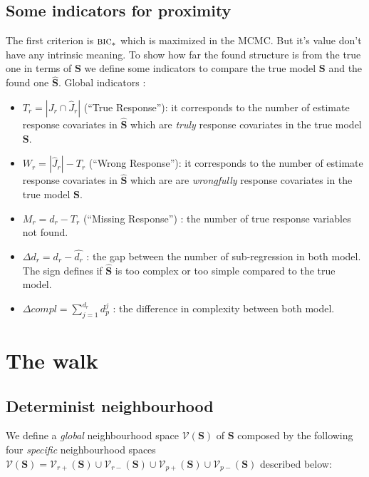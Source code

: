 \documentclass[12pt,a4paper]{report}
\begin{document}
		\subsection{Some indicators for proximity}
		The first criterion is $\mbox{{\sc bic}}_*$ which is maximized in the MCMC. But it's value don't have any intrinsic meaning. To show how far the found structure is from the true one in terms of $\boldsymbol{S}$ we define some indicators to compare the true model $\boldsymbol{S}$ and the found one $\hat{\boldsymbol{S}}$.
			Global indicators :
			\begin{itemize}
				\item $T_r=|J_r \cap \hat{J}_r|$ (``True Response''): it corresponds to the number of estimate response covariates in $\hat{\boldsymbol{S}}$ which are {\it truly} response covariates in the true model $\boldsymbol{S}$.
				\item $W_r=|\hat{J}_r|-T_r$ (``Wrong Response''): it corresponds to the number of estimate response covariates in $\hat{\boldsymbol{S}}$ which are are {\it wrongfully} response covariates in the true model $\boldsymbol{S}$.
				\item $M_r=d_r-T_r$ (``Missing Response'') : the number of true response variables not found.
				\item $\Delta d_r=d_r-\hat{d_r}$ : the gap between the number of sub-regression in both model. The sign defines if $\hat{\boldsymbol{S}}$ is too complex or too simple compared to the true model.
				\item $\Delta compl=\sum_{j=1}^{d_r}d_p^j$ : the difference in complexity between both model.
			\end{itemize}

			
			
	\section{The walk}
		\subsection{Determinist neighbourhood}
	
We define a {\it global} neighbourhood space $\mathcal{V}(\boldsymbol{S})$ of $\boldsymbol{S}$ composed by the following four {\it specific} neighbourhood spaces $\mathcal{V}(\boldsymbol{S})=\mathcal{V}_{r+}(\boldsymbol{S})\cup\mathcal{V}_{r-}(\boldsymbol{S})\cup\mathcal{V}_{p+}(\boldsymbol{S})\cup\mathcal{V}_{p-}(\boldsymbol{S})$ described below:
\end{document}
